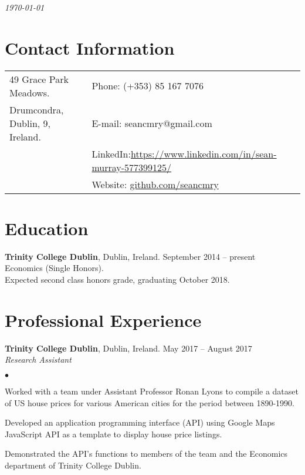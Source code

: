 \documentclass[margin,line]{res}
\newenvironment{list2}{
  \begin{list}{$\bullet$}{%
      \setlength{\itemsep}{0in}
      \setlength{\parsep}{0in} \setlength{\parskip}{0in}
      \setlength{\topsep}{0in} \setlength{\partopsep}{0in}
      \setlength{\leftmargin}{0.2in}}}{\end{list}}
\begin{document}
 \hfill {\em \today}

\begin{resume}
\section{\sc Contact Information}

\vspace{.05in}
\begin{tabular}{@{}p{3.5in}p{3in}}
49 Grace Park Meadows.            & {Phone:}  (+353) 85 167 7076 \\
Drumcondra, Dublin, 9, Ireland.  & {E-mail:}  seancmry@gmail.com\\
 & {LinkedIn:}\hspace{1mm}\url{https://www.linkedin.com/in/sean-murray-577399125/} \\
 & {Website:} \url{github.com/seancmry}\\
\end{tabular}

\section{\sc Education}
{\bf Trinity College Dublin}, Dublin, Ireland. \hfill September 2014 -- present\\
Economics (Single Honors).\\
Expected second class honors grade, graduating October 2018.

\section{\sc Professional Experience}
{\bf Trinity College Dublin}, Dublin, Ireland. \hfill{May 2017 -- August 2017}\\
{\em Research Assistant}
\begin{list2} %
\item Worked with a team under Assistant Professor Ronan Lyons to compile a dataset of US house prices for various American cities for the period between 1890-1990. 
\item Developed an application programming interface (API) using Google Maps JavaScript API as a template to display house price listings. 
\item Demonstrated the API's functions to members of the team and the Economics department of Trinity College Dublin.


\end{list2}
\end{resume}
\end{document}
